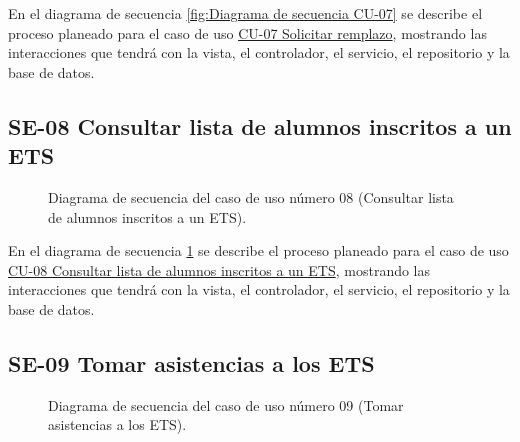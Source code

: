 En el diagrama de secuencia \ref{fig:Diagrama de secuencia CU-07} se describe el proceso planeado para el caso de uso \hyperlink{CU-07}{CU-07 Solicitar remplazo}, mostrando las interacciones que tendrá con la vista, el controlador, el servicio, el repositorio y la base de datos.

\newpage

\subsection{SE-08 Consultar lista de alumnos inscritos a un ETS}

\begin{figure}[htbp!]
	\begin{center}
		\caption{Diagrama de secuencia del caso de uso número 08 (Consultar lista de alumnos inscritos a un ETS).}
		\label{fig:Diagrama de secuencia CU-08}
	\end{center}
\end{figure}

En el diagrama de secuencia \ref{fig:Diagrama de secuencia CU-08} se describe el proceso planeado para el caso de uso \hyperlink{CU-08}{CU-08 Consultar lista de alumnos inscritos a un ETS}, mostrando las interacciones que tendrá con la vista, el controlador, el servicio, el repositorio y la base de datos.

\newpage

\subsection{SE-09 Tomar asistencias a los ETS}

\begin{figure}[htbp!]
	\begin{center}
		\caption{Diagrama de secuencia del caso de uso número 09 (Tomar asistencias a los ETS).}
		\label{fig:Diagrama de secuencia CU-09}
	\end{center}
\end{figure}


